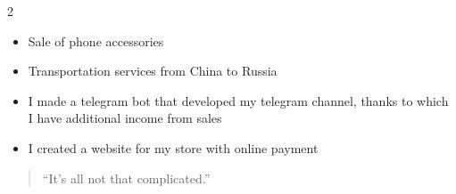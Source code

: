 \documentclass[10pt,a4paper,ragged2e,withhyper]{altacv}
\begin{document}
\begin{paracol}{2}

\begin{itemize}
\item Sale of phone accessories
\end{itemize}

\divider

\begin{itemize}
\item Transportation services from China to Russia
\end{itemize}


\begin{itemize}
\item I made a telegram bot that developed my telegram channel, thanks to which I have additional income from sales
\end{itemize}

\divider

\begin{itemize}
\item I created a website for my store with online payment
\end{itemize}


\medskip



\newpage


\switchcolumn


\begin{quote}
``It's all not that complicated.''
\end{quote}


\end{paracol}
\end{document}
